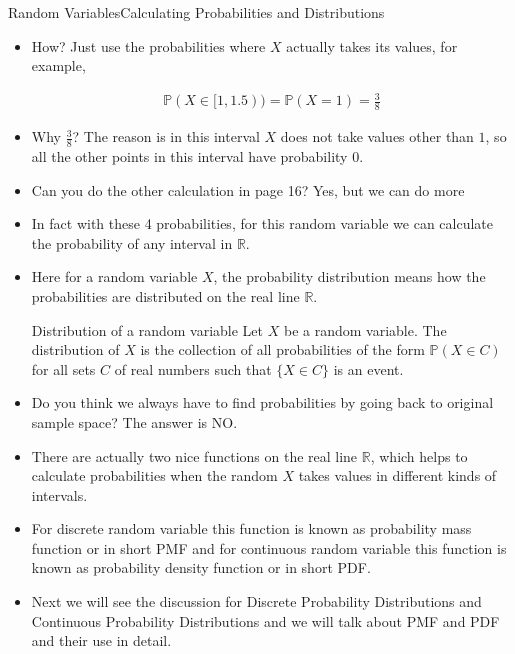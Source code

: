 \documentclass[8pt, usepdftitle=false]{beamer}
\begin{document}
\begin{frame}[allowframebreaks]{Random Variables}{Calculating Probabilities and Distributions}
\begin{itemize}
\item How? Just use the probabilities where $X$ actually takes its values, for example,

\begin{align*}
\mathbb{P}( X \in [1, 1.5)) = \mathbb{P}(X = 1) =  \frac{3}{8}
\end{align*}

\item Why $\frac{3}{8}$? The reason is in this interval $X$ does not take values other than $1$, so all the other points in this interval have probability $0$.


\item Can you do the other calculation in page 16? Yes, but we can do more

\item In fact with these 4 probabilities, for this random variable we can calculate the probability of \alert{any interval in $\mathbb{R}$}.

\item Here for a random variable $X$, the probability distribution means how the probabilities are distributed on the real line $\mathbb{R}$.

\begin{varblock}{Distribution of a random variable}
	Let $X$ be a random variable. The distribution of $X$ is the collection of all probabilities of the form $\mathbb{P}(X \in C)$ for all sets $C$ of real numbers such that $\{X \in C\}$ is an event.
\end{varblock}



\framebreak


\item Do you think we always have to find probabilities by going back to original sample space? The answer is NO.

\item There are actually two nice functions on the real line $\mathbb{R}$, which helps to calculate probabilities when the random $X$ takes values in different kinds of intervals.

\item For discrete random variable this function is known as \alert{probability mass function} or in short \alert{PMF} and for continuous random variable this function is known as \alert{probability density function} or in short \alert{PDF}.

\item Next we will see the discussion for Discrete Probability Distributions and Continuous Probability Distributions and we will talk about PMF and PDF and their use in detail.






\end{itemize}
\end{frame}
\end{document}
